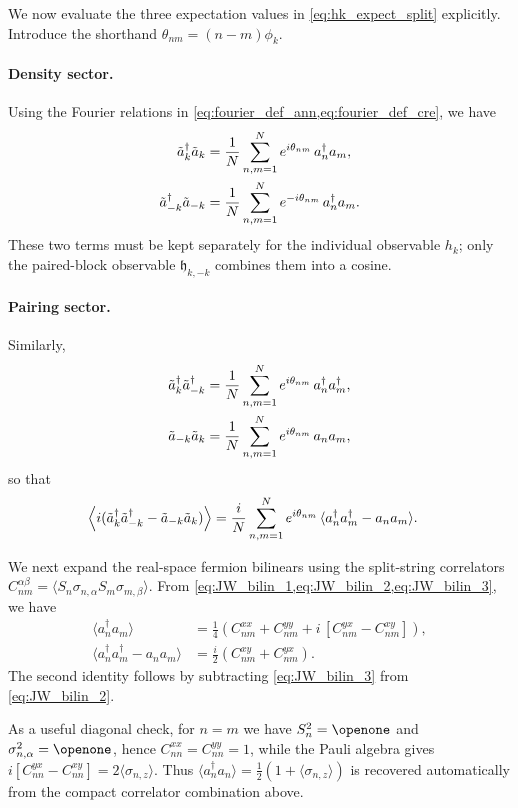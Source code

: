 \documentclass[aps,prx,twocolumn,superscriptaddress,nofootinbib,nolongbibliography,nobalancelastpage,10pt,floatfix]{revtex4-2}
\begin{document}
We now evaluate the three expectation values in \cref{eq:hk_expect_split} explicitly.
Introduce the shorthand $\theta_{nm}=(n-m)\phi_k$.

\paragraph{Density sector.}
Using the Fourier relations in \cref{eq:fourier_def_ann,eq:fourier_def_cre}, we have
\begin{align}
    \tilde{a}_k^\dag\tilde{a}_k
    &= \frac{1}{N}\sum_{n,m=1}^N e^{i\theta_{nm}}\,a_n^\dag a_m,\\
    \tilde{a}_{-k}^\dag\tilde{a}_{-k}
    &= \frac{1}{N}\sum_{n,m=1}^N e^{-i\theta_{nm}}\,a_n^\dag a_m.
\end{align}
These two terms must be kept separately for the individual observable $h_k$; only the paired-block observable $\mathfrak h_{k,-k}$ combines them into a cosine.

\paragraph{Pairing sector.}
Similarly,
\begin{align}
    \tilde{a}_k^\dag\tilde{a}_{-k}^\dag
    &= \frac{1}{N}\sum_{n,m=1}^N e^{i\theta_{nm}}\,a_n^\dag a_m^\dag,\\
    \tilde{a}_{-k}\tilde{a}_k
    &= \frac{1}{N}\sum_{n,m=1}^N e^{i\theta_{nm}}\,a_n a_m,
\end{align}
so that
\begin{align}
    \Big\langle i(\tilde{a}_k^\dag\tilde{a}_{-k}^\dag - \tilde{a}_{-k}\tilde{a}_k) \Big\rangle
    &= \frac{i}{N}\sum_{n,m=1}^N e^{i\theta_{nm}}\,\langle a_n^\dag a_m^\dag - a_n a_m\rangle.
\end{align}

We next expand the real-space fermion bilinears using the split-string correlators
$C^{\alpha\beta}_{nm}=\langle S_n\sigma_{n,\alpha}S_m\sigma_{m,\beta}\rangle$.
From \cref{eq:JW_bilin_1,eq:JW_bilin_2,eq:JW_bilin_3}, we have
\begin{align}
    \langle a_n^\dag a_m\rangle
    &= \frac{1}{4}\left(C^{xx}_{nm}+C^{yy}_{nm}+ i\,[C^{yx}_{nm}-C^{xy}_{nm}]\right),\\
    \langle a_n^\dag a_m^\dag - a_n a_m\rangle
    &= \frac{i}{2}\left(C^{xy}_{nm}+C^{yx}_{nm}\right).
\end{align}
The second identity follows by subtracting \cref{eq:JW_bilin_3} from \cref{eq:JW_bilin_2}.

As a useful diagonal check, for $n=m$ we have $S_n^2=\Id$ and $\sigma_{n,\alpha}^2=\Id$, hence
$C^{xx}_{nn}=C^{yy}_{nn}=1$, while the Pauli algebra gives
$i[C^{yx}_{nn}-C^{xy}_{nn}]=2\langle\sigma_{n,z}\rangle$.
Thus $\langle a_n^\dag a_n\rangle=\frac{1}{2}(1+\langle\sigma_{n,z}\rangle)$ is recovered automatically from the compact correlator combination above.
\end{document}
